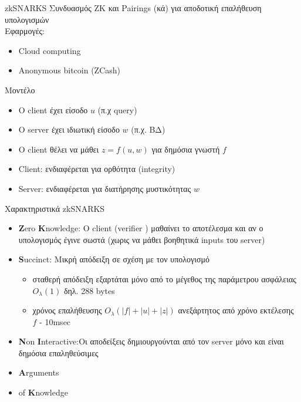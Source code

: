 \documentclass[handout]{beamer}
\begin{document}
\begin{frame}{zkSNARKS}
Συνδυασμός ZK και Pairings (κά) για αποδοτική επαλήθευση υπολογισμών \\
\pause
Εφαρμογές:
\begin{itemize}
    \item Cloud computing
    \item Anonymous bitcoin (ZCash)
\end{itemize} \pause

\begin{block}{Μοντέλο}
\begin{itemize}
	\item O client έχει είσοδο $u$ (π.χ query) \pause
    \item O server έχει ιδιωτική είσοδο $w$ (π.χ. ΒΔ) \pause
    \item O client θέλει να μάθει $z=f(u,w)$ για δημόσια γνωστή $f$  \pause
    \item Client: ενδιαφέρεται για ορθότητα (integrity) \pause
    \item Server: ενδιαφέρεται για διατήρησης μυστικότητας $w$  \pause
\end{itemize} 
\end{block}
\end{frame}

\begin{frame}{Χαρακτηριστικά zkSNARKS}
	\begin{itemize}
		\item \textbf{Z}ero \textbf{K}nowledge: O client (verifier \ver) μαθαίνει το αποτέλεσμα και αν ο υπολογισμός έγινε σωστά (χωρις να μάθει βοηθητικά inputs του server) \pause
		\item \textbf{S}uccinct: Μικρή απόδειξη σε σχέση με τον υπολογισμό \pause
		\begin{itemize}
			\item σταθερή απόδειξη εξαρτάται μόνο από το μέγεθος της παράμετρου ασφάλειας $O_{\lambda}(1)$ δηλ. 288 bytes
			\item χρόνος επαλήθευσης $O_{\lambda}(|f| + |u| + |z|)$ ανεξάρτητος από χρόνο εκτέλεσης $f$ - 10msec
		\end{itemize} \pause
		\item \textbf{N}on \textbf{I}nteractive:Οι αποδείξεις δημιουργούνται από τον server μόνο και είναι δημόσια επαληθεύσιμες \pause
		\item \textbf{A}rguments \pause
		\item of \textbf{K}nowledge  
	\end{itemize}
\end{frame}
\end{document}
